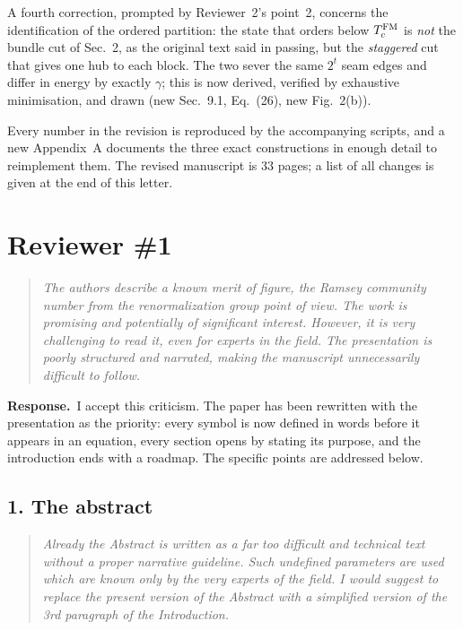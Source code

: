 \documentclass[11pt]{article}
\newenvironment{point}{\begin{quote}\itshape}{\end{quote}}
\newcommand{\reply}{\par\noindent\textbf{Response.}\ }
\begin{document}
A fourth correction, prompted by Reviewer~2's point~2, concerns the
identification of the ordered partition: the state that orders below
$T_c^{\rm FM}$ is \emph{not} the bundle cut of Sec.~2, as the original text
said in passing, but the \emph{staggered} cut that gives one hub to each block.
The two sever the same $2^t$ seam edges and differ in energy by exactly
$\gamma$; this is now derived, verified by exhaustive minimisation, and drawn
(new Sec.~9.1, Eq.~(26), new Fig.~2(b)).

Every number in the revision is reproduced by the accompanying scripts, and a
new Appendix~A documents the three exact constructions in enough detail to
reimplement them. The revised manuscript is $33$ pages; a list of all changes
is given at the end of this letter.

\section*{Reviewer \#1}

\begin{point}
The authors describe a known merit of figure, the Ramsey community number from
the renormalization group point of view. The work is promising and potentially
of significant interest. However, it is very challenging to read it, even for
experts in the field. The presentation is poorly structured and narrated,
making the manuscript unnecessarily difficult to follow.
\end{point}

\reply I accept this criticism. The paper has been rewritten with the
presentation as the priority: every symbol is now defined in words before it
appears in an equation, every section opens by stating its purpose, and the
introduction ends with a roadmap. The specific points are addressed below.

\subsection*{1. The abstract}

\begin{point}
Already the Abstract is written as a far too difficult and technical text
without a proper narrative guideline. Such undefined parameters are used which
are known only by the very experts of the field. I would suggest to replace the
present version of the Abstract with a simplified version of the 3rd paragraph
of the Introduction.
\end{point}
\end{document}
